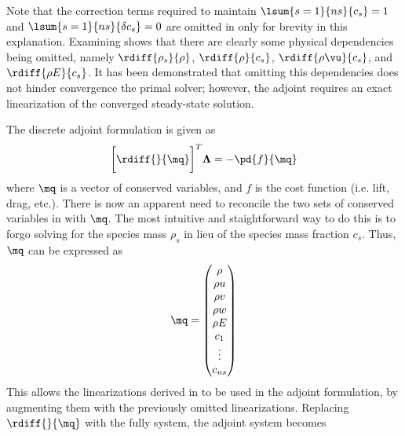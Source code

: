 Note that the correction terms required to maintain $\lsum{s=1}{ns}{c_s} = 1$
and $\lsum{s=1}{ns}{\delta c_s} = 0$ are omitted in  only
for brevity in this explanation.  Examining 
shows that there are clearly some physical dependencies being omitted, namely
$\rdiff{\rho_s}{\rho}$, $\rdiff{\rho}{c_s}$, $\rdiff{\rho \vu}{c_s}$, and 
$\rdiff{\rho E}{c_s}$.  It has been demonstrated that omitting this dependencies
does not hinder convergence the primal solver; however, the adjoint requires an
exact linearization of the converged steady-state solution.

The discrete adjoint formulation is given as
\begin{equation}
  \bigg[\rdiff{}{\mq}\bigg]^T\mathbf{\Lambda}= -\pd{f}{\mq}
  \label{adjoint}
\end{equation}
where $\mq$ is a vector of conserved variables, and $f$ is the cost function (i.e.
lift, drag, etc.). There is now an apparent need to reconcile the two sets of
conserved variables in  with $\mq$.  The most intuitive and
staightforward way to do this is to forgo solving for the species mass $\rho_s$
in lieu of the species mass fraction $c_s$.  Thus, $\mq$ can be expressed as
\begin{equation}
  \mq =
  \begin{pmatrix}
  	\rho \\
  	\rho u \\
  	\rho v \\
  	\rho w \\
  	\rho E \\
    c_1 \\
    \vdots \\
    c_{ns}
  \end{pmatrix}
  \label{q-vec}
\end{equation}
This allows the linearizations derived in  to
be used in the adjoint formulation, by augmenting them with the previously
omitted linearizations.  Replacing $\rdiff{}{\mq}$ with the fully system, the
adjoint system becomes
